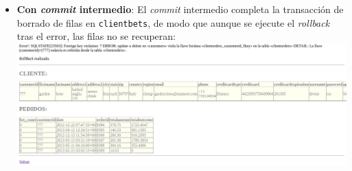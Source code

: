 \documentclass{article}
\begin{document}
\begin{itemize}
\begin{itemize}
                \newpage
            \item \textbf{Con \textit{commit} intermedio}: El \textit{commit} intermedio completa la transacción de borrado de filas en \texttt{clientbets}, de modo que aunque se ejecute el \textit{rollback} tras el error, las filas no se recuperan:
                \smallbreak
                \includegraphics[width=\linewidth]{img/trans_commit}
        \end{itemize}
\end{itemize}
\end{document}
